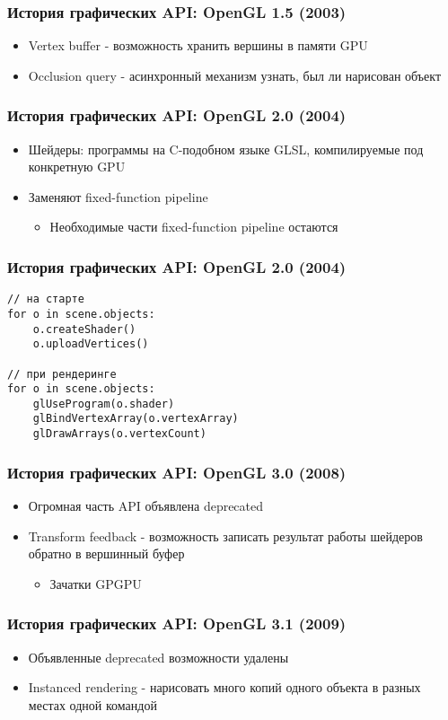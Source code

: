 \documentclass{beamer}
\begin{document}
\begin{frame}
\frametitle{История графических API: OpenGL 1.5 (2003)}
\begin{itemize}
\item Vertex buffer - возможность хранить вершины в памяти GPU
\pause
\item Occlusion query - асинхронный механизм узнать, был ли нарисован объект
\end{itemize}
\end{frame}

\begin{frame}
\frametitle{История графических API: OpenGL 2.0 (2004)}
\begin{itemize}
\item Шейдеры: программы на C-подобном языке GLSL, компилируемые под конкретную GPU
\item Заменяют fixed-function pipeline
\begin{itemize}
\item Необходимые части fixed-function pipeline остаются
\end{itemize}
\end{itemize}
\end{frame}

\begin{frame}[fragile]
\frametitle{История графических API: OpenGL 2.0 (2004)}
\begin{verbatim}
// на старте
for o in scene.objects:
    o.createShader()
    o.uploadVertices()

// при рендеринге
for o in scene.objects:
    glUseProgram(o.shader)
    glBindVertexArray(o.vertexArray)
    glDrawArrays(o.vertexCount)
\end{verbatim}
\end{frame}

\begin{frame}
\frametitle{История графических API: OpenGL 3.0 (2008)}
\begin{itemize}
\item Огромная часть API объявлена deprecated
\pause
\item Transform feedback - возможность записать результат работы шейдеров обратно в вершинный буфер
\begin{itemize}
\item Зачатки GPGPU
\end{itemize}
\end{itemize}
\end{frame}

\begin{frame}
\frametitle{История графических API: OpenGL 3.1 (2009)}
\begin{itemize}
\item Объявленные deprecated возможности удалены
\pause
\item Instanced rendering - нарисовать много копий одного объекта в разных местах одной командой
\end{itemize}
\end{frame}
\end{document}
